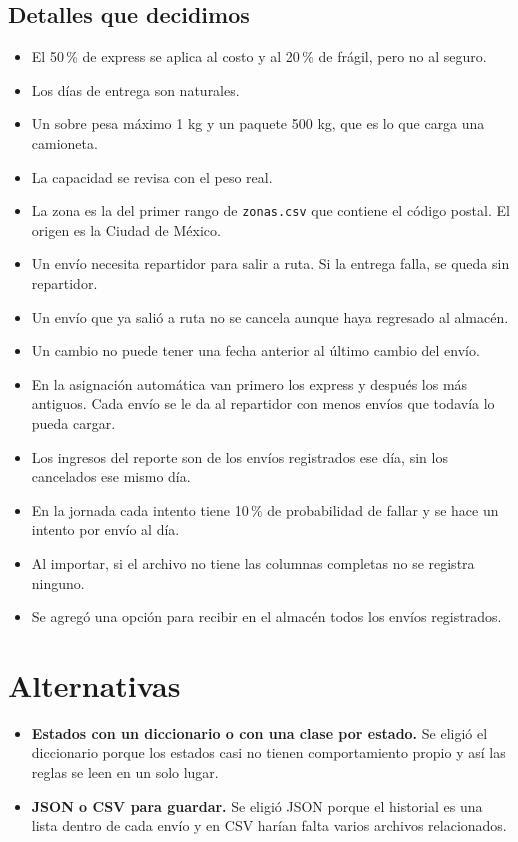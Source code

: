 \documentclass[11pt]{article}
\begin{document}
\subsection{Detalles que decidimos}
\begin{itemize}
\item El 50\,\% de express se aplica al costo y al 20\,\% de frágil, pero no al seguro.
\item Los días de entrega son naturales.
\item Un sobre pesa máximo 1 kg y un paquete 500 kg, que es lo que carga una camioneta.
\item La capacidad se revisa con el peso real.
\item La zona es la del primer rango de \texttt{zonas.csv} que contiene el código postal. El origen es la Ciudad de México.
\item Un envío necesita repartidor para salir a ruta. Si la entrega falla, se queda sin repartidor.
\item Un envío que ya salió a ruta no se cancela aunque haya regresado al almacén.
\item Un cambio no puede tener una fecha anterior al último cambio del envío.
\item En la asignación automática van primero los express y después los más antiguos. Cada envío se le da al
repartidor con menos envíos que todavía lo pueda cargar.
\item Los ingresos del reporte son de los envíos registrados ese día, sin los cancelados ese mismo día.
\item En la jornada cada intento tiene 10\,\% de probabilidad de fallar y se hace un intento por envío al día.
\item Al importar, si el archivo no tiene las columnas completas no se registra ninguno.
\item Se agregó una opción para recibir en el almacén todos los envíos registrados.
\end{itemize}

\section{Alternativas}
\begin{itemize}
\item \textbf{Estados con un diccionario o con una clase por estado.} Se eligió el diccionario porque los estados
casi no tienen comportamiento propio y así las reglas se leen en un solo lugar.
\item \textbf{JSON o CSV para guardar.} Se eligió JSON porque el historial es una lista dentro de cada envío y en
CSV harían falta varios archivos relacionados.
\end{itemize}
\end{document}
